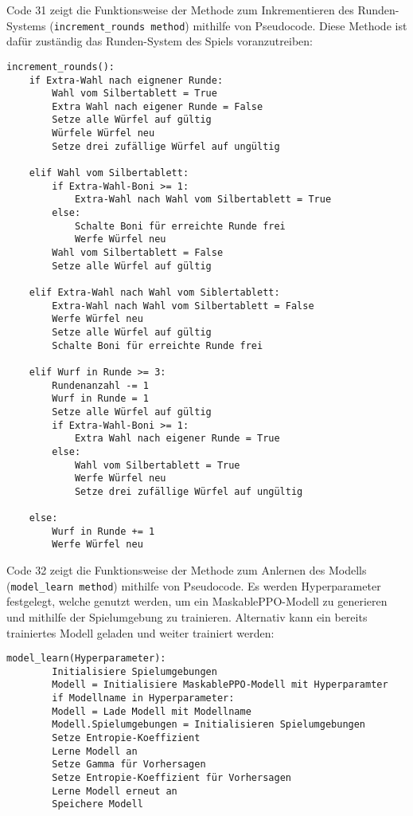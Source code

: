 Code 31 zeigt die Funktionsweise der Methode zum Inkrementieren des Runden-Systems (\texttt{increment\_rounds method}) mithilfe von Pseudocode. Diese Methode ist dafür zuständig das Runden-System des Spiels voranzutreiben:
\vspace{0.5cm}
\begin{lstlisting}[caption={Methode zum Inkrementieren des Runden-Systems}]
increment_rounds():
	if Extra-Wahl nach eignener Runde:
		Wahl vom Silbertablett = True
		Extra Wahl nach eigener Runde = False
		Setze alle Würfel auf gültig
		Würfele Würfel neu
		Setze drei zufällige Würfel auf ungültig
	
	elif Wahl vom Silbertablett:
		if Extra-Wahl-Boni >= 1:
			Extra-Wahl nach Wahl vom Silbertablett = True
		else:
			Schalte Boni für erreichte Runde frei
			Werfe Würfel neu
		Wahl vom Silbertablett = False
		Setze alle Würfel auf gültig
	
	elif Extra-Wahl nach Wahl vom Siblertablett:
		Extra-Wahl nach Wahl vom Silbertablett = False
		Werfe Würfel neu
		Setze alle Würfel auf gültig
		Schalte Boni für erreichte Runde frei
	
	elif Wurf in Runde >= 3:
		Rundenanzahl -= 1
		Wurf in Runde = 1
		Setze alle Würfel auf gültig
		if Extra-Wahl-Boni >= 1:
			Extra Wahl nach eigener Runde = True
		else:
			Wahl vom Silbertablett = True
			Werfe Würfel neu
			Setze drei zufällige Würfel auf ungültig
			
	else:
		Wurf in Runde += 1
		Werfe Würfel neu
\end{lstlisting}

\begin{minipage}{\linewidth}
	Code 32 zeigt die Funktionsweise der Methode zum Anlernen des Modells (\texttt{model\_learn method}) mithilfe von Pseudocode. Es werden Hyperparameter festgelegt, welche genutzt werden, um ein MaskablePPO-Modell zu generieren und mithilfe der Spielumgebung zu trainieren. Alternativ kann ein bereits trainiertes Modell geladen und weiter trainiert werden:
	\vspace{0.5cm}
	\begin{lstlisting}[caption={Methode zu Anlernen des Modells},morekeywords={Hyperparameter}]
		model_learn(Hyperparameter):
		Initialisiere Spielumgebungen
		Modell = Initialisiere MaskablePPO-Modell mit Hyperparamter
		if Modellname in Hyperparameter:
		Modell = Lade Modell mit Modellname
		Modell.Spielumgebungen = Initialisieren Spielumgebungen
		Setze Entropie-Koeffizient
		Lerne Modell an
		Setze Gamma für Vorhersagen
		Setze Entropie-Koeffizient für Vorhersagen
		Lerne Modell erneut an
		Speichere Modell
	\end{lstlisting}
\end{minipage}


